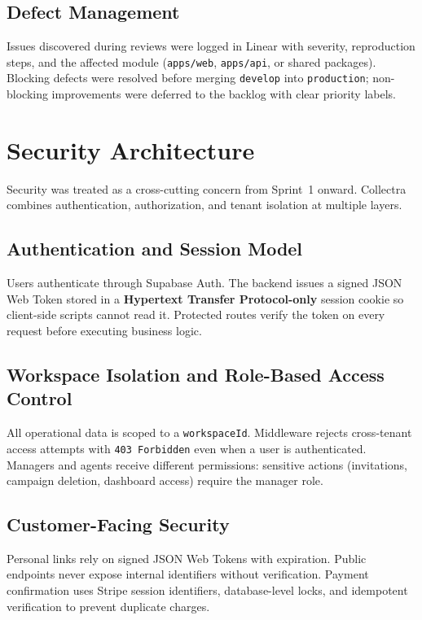 \documentclass[12pt,a4paper]{report}
\begin{document}
\subsection{Defect Management}

Issues discovered during reviews were logged in Linear with severity, reproduction steps,
and the affected module (\texttt{apps/web}, \texttt{apps/api}, or shared packages).
Blocking defects were resolved before merging \texttt{develop} into \texttt{production};
non-blocking improvements were deferred to the backlog with clear priority labels.

\section{Security Architecture}
\label{sec:security}

Security was treated as a cross-cutting concern from Sprint~1 onward.
Collectra combines authentication, authorization, and tenant isolation at multiple layers.

\subsection{Authentication and Session Model}

Users authenticate through Supabase Auth.
The backend issues a signed JSON Web Token stored in a \textbf{Hypertext Transfer Protocol-only}
session cookie so client-side scripts cannot read it.
Protected routes verify the token on every request before executing business logic.

\subsection{Workspace Isolation and Role-Based Access Control}

All operational data is scoped to a \texttt{workspaceId}.
Middleware rejects cross-tenant access attempts with \texttt{403 Forbidden} even when a user
is authenticated.
Managers and agents receive different permissions: sensitive actions (invitations, campaign
deletion, dashboard access) require the manager role.

\subsection{Customer-Facing Security}

Personal links rely on signed JSON Web Tokens with expiration.
Public endpoints never expose internal identifiers without verification.
Payment confirmation uses Stripe session identifiers, database-level locks, and idempotent
verification to prevent duplicate charges.
\end{document}
